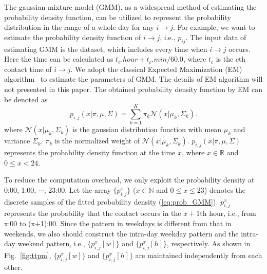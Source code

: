 The gaussian mixture model (GMM), as a widespread method
of estimating the probability density function,
can be utilized to represent the probability distribution
in the range of a whole day for any $i \rightarrow j$.
For example, we want to estimate the probability density function of $i \rightarrow j$,
i.e., $p_{i j}$.
The input data of estimating GMM
is the dataset, which includes every time when $i \rightarrow j$ occurs.
Here the time can be calculated as $t_{c}.hour+t_{c}.min/60.0$,
where $t_{c}$ is the $c$th contact time of $i \rightarrow j$.
We adopt the classical Expected Maximization (EM) algorithm~\cite{EM77}
to estimate the parameters of GMM.
The details of EM algorithm will not presented in this paper.
The obtained probability density function by EM can be denoted as
\begin{equation}
\label{eq:prob_GMM}
p_{i,j}(x | \pi, \mu, \Sigma) =
\sum_{k=1}^{K} \pi_{k} \mathcal{N}(x|\mu_{k}, \Sigma_{k}).
\end{equation}
where $\mathcal{N}(x|\mu_{k}, \Sigma_{k})$ is the gaussian distribution function
with mean $\mu_{k}$ and variance $\Sigma_{k}$.
$\pi_{k}$ is the normalized weight of $\mathcal{N}(x|\mu_{k}, \Sigma_{k})$.
$p_{i,j}(x | \pi, \mu, \Sigma)$ represents the probability density function
at the time $x$,
where $x \in \mathbb{R}$ and $0 \le x < 24$.

To reduce the computation overhead,
we only exploit the probability density at 0:00, 1:00, $\cdots$, 23:00.
Let the array $\{p_{i,j}^x\}$ ($x \in \mathbb{N}$ and $0 \le x \le 23$)
denotes the discrete samples of
the fitted probability density (\ref{eq:prob_GMM}).
$p_{i,j}^x$ represents the probability that the contact occurs
in the $x+1$th hour, i.e., from x:00 to (x+1):00.
Since the pattern in weekdays is different from that in weekends,
we also should construct the intra-day weekday pattern
and the intra-day weekend pattern,
i.e., $\{p_{i, j}^{x}[w]\}$ and $\{p_{i, j}^{x}[h]\}$, respectively.
As shown in Fig.~\ref{fig:ttpm},
$\{p_{i, j}^{x}[w]\}$ and $\{p_{i, j}^{x}[h]\}$
are maintained independently from each other.

